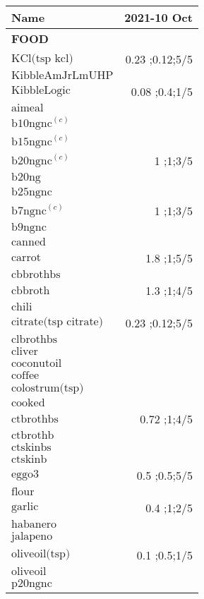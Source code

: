 \begin{table}[H]
\centering
\begin{tabular}{|l|r|}
\hline
Name&2021-10 Oct\\
\hline
{\bf FOOD}&\\
$\textrm{KCl(tsp~kcl)}$&0.23 ;0.12;5/5\\
$\textrm{KibbleAmJrLmUHP}$&\\
$\textrm{KibbleLogic}$&0.08 ;0.4;1/5\\
$\textrm{aimeal}$&\\
$\textrm{b10ngnc}^{\left(c\right)}$&\\
$\textrm{b15ngnc}^{\left(c\right)}$&\\
$\textrm{b20ngnc}^{\left(c\right)}$&1 ;1;3/5\\
$\textrm{b20ng}$&\\
$\textrm{b25ngnc}$&\\
$\textrm{b7ngnc}^{\left(c\right)}$&1 ;1;3/5\\
$\textrm{b9ngnc}$&\\
$\textrm{canned}$&\\
$\textrm{carrot}$&1.8 ;1;5/5\\
$\textrm{cbbrothbs}$&\\
$\textrm{cbbroth}$&1.3 ;1;4/5\\
$\textrm{chili}$&\\
$\textrm{citrate(tsp~citrate)}$&0.23 ;0.12;5/5\\
$\textrm{clbrothbs}$&\\
$\textrm{cliver}$&\\
$\textrm{coconutoil}$&\\
$\textrm{coffee}$&\\
$\textrm{colostrum(tsp)}$&\\
$\textrm{cooked}$&\\
$\textrm{ctbrothbs}$&0.72 ;1;4/5\\
$\textrm{ctbrothb}$&\\
$\textrm{ctskinbs}$&\\
$\textrm{ctskinb}$&\\
$\textrm{eggo3}$&0.5 ;0.5;5/5\\
$\textrm{flour}$&\\
$\textrm{garlic}$&0.4 ;1;2/5\\
$\textrm{habanero}$&\\
$\textrm{jalapeno}$&\\
$\textrm{oliveoil(tsp)}$&0.1 ;0.5;1/5\\
$\textrm{oliveoil}$&\\
$\textrm{p20ngnc}$&\\

\end{tabular}
\end{table}
